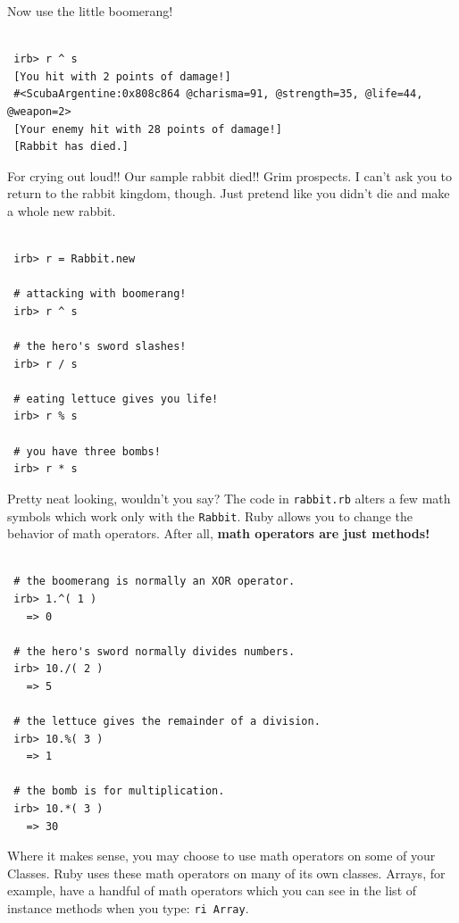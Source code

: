 \documentclass[10pt,twoside]{report}
\begin{document}
Now use the little boomerang!


\begin{lstlisting}

 irb> r ^ s
 [You hit with 2 points of damage!]
 #<ScubaArgentine:0x808c864 @charisma=91, @strength=35, @life=44, @weapon=2>
 [Your enemy hit with 28 points of damage!]
 [Rabbit has died.]

\end{lstlisting}


For crying out loud!!  Our sample rabbit died!!  Grim prospects.  I
can't ask you to return to the rabbit kingdom, though. Just pretend
like you didn't die and make a whole new rabbit.


\begin{lstlisting}

 irb> r = Rabbit.new

 # attacking with boomerang!
 irb> r ^ s

 # the hero's sword slashes!
 irb> r / s

 # eating lettuce gives you life!
 irb> r % s

 # you have three bombs!
 irb> r * s

\end{lstlisting}


Pretty neat looking, wouldn't you say?  The code in
\lstinline[breaklines=true]|rabbit.rb| alters a few math symbols which
work only with the \lstinline[breaklines=true]|Rabbit|.  Ruby allows
you to change the behavior of math operators.  After all, {\bf math
  operators are just methods!}


\begin{lstlisting}

 # the boomerang is normally an XOR operator.
 irb> 1.^( 1 )
   => 0

 # the hero's sword normally divides numbers.
 irb> 10./( 2 )
   => 5

 # the lettuce gives the remainder of a division.
 irb> 10.%( 3 )
   => 1

 # the bomb is for multiplication.
 irb> 10.*( 3 )
   => 30

\end{lstlisting}


Where it makes sense, you may choose to use math operators on some of
your Classes.  Ruby uses these math operators on many of its own
classes.  Arrays, for example, have a handful of math operators which
you can see in the list of instance methods when you type:
\lstinline[breaklines=true]|ri Array|.
\end{document}

